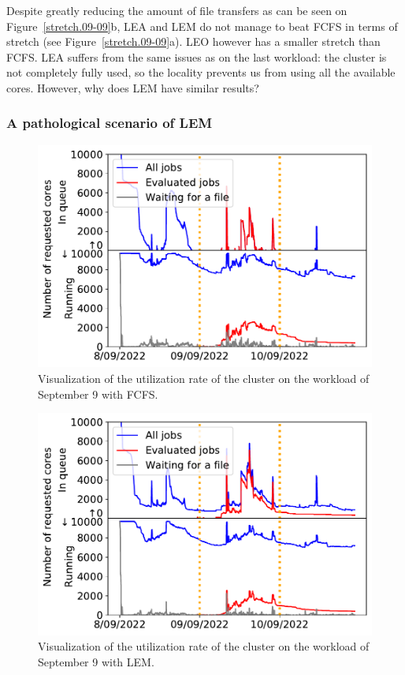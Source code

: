 \documentclass[conference,10pt]{IEEEtran}
\begin{document}
Despite greatly reducing the amount of file transfers as can be seen on Figure~\ref{stretch.09-09}b, LEA and LEM
do not manage to beat FCFS in terms of stretch (see Figure~\ref{stretch.09-09}a). 
LEO however has a smaller stretch than FCFS. 
LEA suffers from the same issues as on the last workload: the cluster is
not completely fully used, so 
the locality prevents us from using all the available cores.
However, why does LEM have similar results?

\subsubsection{A pathological scenario of LEM}

\begin{figure}[t]\centering\includegraphics[width=1\linewidth]{../MBSS/plot/Cluster_usage/2022-09-09->2022-09-09_V10000_Fcfs_Used_nodes_Reduced_450_128_32_256_4_1024_core_by_core.pdf}\caption{Visualization of the utilization rate of the cluster on the workload of September 9 with FCFS.}\label{cluster_09-09_fcfs}\end{figure}
\begin{figure}[t]\centering\includegraphics[width=1\linewidth]{../MBSS/plot/Cluster_usage/2022-09-09->2022-09-09_V10000_Fcfs_with_a_score_mixed_strategy_x500_x1_x0_x0_Used_nodes_Reduced_450_128_32_256_4_1024_core_by_core.pdf}\caption{Visualization of the utilization rate of the cluster on the workload of September 9 with LEM.}\label{cluster_09-09_lem}
\end{figure}
\end{document}
